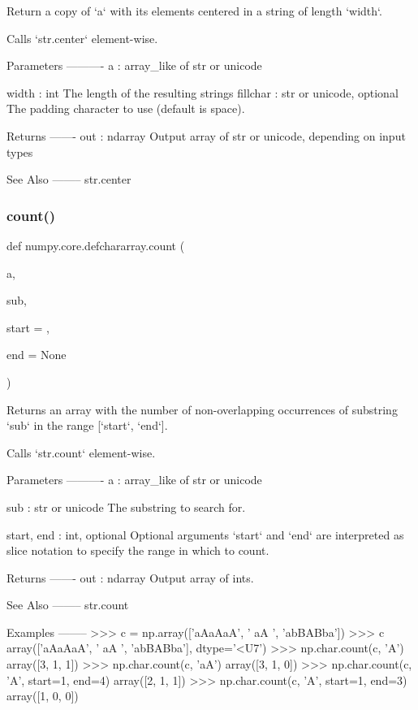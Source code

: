 \begin{DoxyVerb}Return a copy of `a` with its elements centered in a string of
length `width`.

Calls `str.center` element-wise.

Parameters
----------
a : array_like of str or unicode

width : int
    The length of the resulting strings
fillchar : str or unicode, optional
    The padding character to use (default is space).

Returns
-------
out : ndarray
    Output array of str or unicode, depending on input
    types

See Also
--------
str.center\end{DoxyVerb}
 \mbox{\label{namespacenumpy_1_1core_1_1defchararray_ad55baa07b66bc2b0f442f744091c4985}} 
\subsubsection{\texorpdfstring{count()}{count()}}
{\footnotesize\ttfamily def numpy.\+core.\+defchararray.\+count (\begin{DoxyParamCaption}\item[{}]{a,  }\item[{}]{sub,  }\item[{}]{start = {},  }\item[{}]{end = {\ttfamily None} }\end{DoxyParamCaption})}

\begin{DoxyVerb}Returns an array with the number of non-overlapping occurrences of
substring `sub` in the range [`start`, `end`].

Calls `str.count` element-wise.

Parameters
----------
a : array_like of str or unicode

sub : str or unicode
   The substring to search for.

start, end : int, optional
   Optional arguments `start` and `end` are interpreted as slice
   notation to specify the range in which to count.

Returns
-------
out : ndarray
    Output array of ints.

See Also
--------
str.count

Examples
--------
>>> c = np.array(['aAaAaA', '  aA  ', 'abBABba'])
>>> c
array(['aAaAaA', '  aA  ', 'abBABba'], dtype='<U7')
>>> np.char.count(c, 'A')
array([3, 1, 1])
>>> np.char.count(c, 'aA')
array([3, 1, 0])
>>> np.char.count(c, 'A', start=1, end=4)
array([2, 1, 1])
>>> np.char.count(c, 'A', start=1, end=3)
array([1, 0, 0])\end{DoxyVerb}
 \mbox{\label{namespacenumpy_1_1core_1_1defchararray_a01d921d26de7a9209d073f3f70eeebeb}} 
